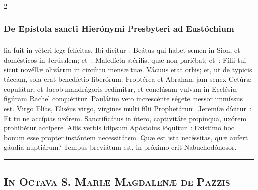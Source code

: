\documentclass[9pt,twoside]{extarticle}
\begin{document}
\begin{multicols}{2}
{\subsubsection*{\center {}}
\subsubsection*{\center De Epístola sancti Hierónymi Presbyteri ad Eustóchium}
\subsubsection*{\center {}}
lia fuit in véteri lege felícitas. Ibi dícitur~: Beátus qui habet semen in Sion, et domésticos in Jerúsalem; et~: Maledícta stérilis, quæ non pariébat; et~: Fílii tui sicut novéllæ olivárum in circúitu mensæ tuæ. Vácuus erat orbis; et, ut de typicis táceam, sola erat benedíctio liberórum. Proptérea et Abraham jam senex Cetúræ copulátur, et Jacob mandrágoris redímitur, et conclúsam vulvam in Ecclésiæ figúram Rachel conquéritur. Paulátim vero increscénte ségete messor immíssus est. Virgo Elías, Eliséus virgo, vírgines multi fílii Prophetárum. Jeremíæ dícitur~: Et tu ne accípias uxórem. Sanctificátus in útero, captivitáte propínqua, uxórem prohibétur accípere. Aliis verbis idípsum Apóstolus lóquitur~: Exístimo hoc bonum esse propter instántem necessitátem. Quæ est ista necéssitas, quæ aufert gáudia nuptiárum? Tempus breviátum est, in próximo erit Nabuchodónosor.

\begin{tightlist}{}
\item {}
\item {}
\end{tightlist}

\begin{center}\textcolor{red}{\rule{\linewidth}{0.5pt}} \end{center}

\subsection*{\center {}}
\subsection*{\center \textsc{In Octava S. Mariæ Magdalenæ de Pazzis}}
}
\end{multicols}
\end{document}
